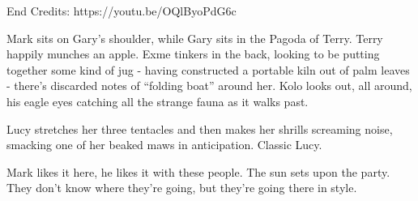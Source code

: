 End Credits:\medskip
https://youtu.be/OQlByoPdG6c\medskip

Mark sits on Gary’s shoulder, while Gary sits in the Pagoda of Terry. Terry happily munches an apple. Exme tinkers in the back, looking to be putting together some kind of jug - having constructed a portable kiln out of palm leaves - there’s discarded notes of “folding boat” around her. Kolo looks out, all around, his eagle eyes catching all the strange fauna as it walks past.\medskip

Lucy stretches her three tentacles and then makes her shrills screaming noise, smacking one of her beaked maws in anticipation. Classic Lucy.\medskip

Mark likes it here, he likes it with these people. The sun sets upon the party. They don’t know where they’re going, but they’re going there in style.\medskip